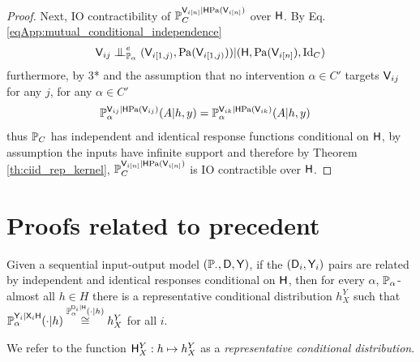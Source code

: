 \begin{proof}
Next, IO contractibility of $\mathbb{P}_C^{\mathsf{V}_{i[n]}|\mathsf{H}\mathrm{Pa}(\mathsf{V}_{i [n]})}$ over $\mathsf{H}$. By Eq. \eqref{eqApp:mutual_conditional_independence}
\begin{align}
    \RV{V}_{ij}\CI^e_{\prob{P}_{\alpha}} (\RV{V}_{i [1,j)},\mathrm{Pa}(\RV{V}_{i [1,j)}) )|(\RV{H},\mathrm{Pa}(\RV{V}_{i[n]}),\text{Id}_C)
\end{align}
furthermore, by 3* and the assumption that no intervention $\alpha\in C'$ targets $\mathsf{V}_{ij}$ for any $j$, for any $\alpha\in C'$
\begin{align}
    \mathbb{P}_{\alpha}^{\mathsf{V}_{ij}|\mathsf{H}\mathrm{Pa}(\mathsf{V}_{ij})}(A|h,y) &= \mathbb{P}_{\alpha}^{\mathsf{V}_{ik}|\mathsf{H}\mathrm{Pa}(\mathsf{V}_{ik})}(A|h,y) 
\end{align}
thus $\mathbb{P}_C$ has independent and identical response functions conditional on $\mathsf{H}$, by assumption the inputs have infinite support and therefore by Theorem \ref{th:ciid_rep_kernel}, $\mathbb{P}_C^{\mathsf{V}_{i[n]}|\mathsf{H}\mathrm{Pa}(\mathsf{V}_{i [n]})}$ is IO contractible over $\mathsf{H}$.
\end{proof}

\section{Proofs related to precedent}\label{sec:proof_precedent}


\begin{theorem}\label{th:repr_cond}
Given a sequential input-output model $(\mathbb{P}_\cdot,\mathsf{D},\mathsf{Y})$, if the $(\mathsf{D}_i,\mathsf{Y}_i)$ pairs are related by independent and identical responses conditional on $\mathsf{H}$, then for every $\alpha$, $\mathbb{P}_\alpha$-almost all $h\in H$ there is a representative conditional distribution $h^Y_X$ such that $\mathbb{P}_\alpha^{\mathsf{Y}_i|\mathsf{X}_i\mathsf{H}}(\cdot|h)\overset{\mathbb{P}_\alpha^{\mathsf{D}_i|\mathsf{H}}(\cdot|h)}{\cong} h^Y_X$ for all $i$.

We refer to the function $\mathsf{H}^Y_X:h\mapsto h^Y_X$ as a \emph{representative conditional distribution}.
\end{theorem}

